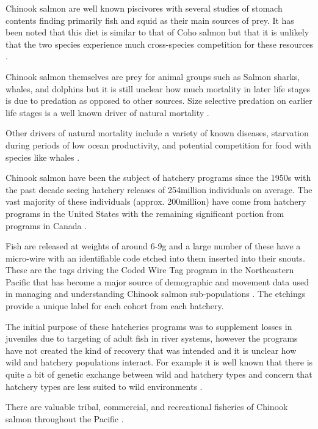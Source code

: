 \documentclass[11pt]{article}
\begin{document}
Chinook salmon are well known piscivores with several studies of stomach contents finding primarily fish and squid as their main sources of prey. It has been noted that this diet is similar to that of Coho salmon but that it is unlikely that the two species experience much cross-species competition for these resources \citep{oceanchinook}. 

Chinook salmon themselves are prey for animal groups such as Salmon sharks, whales, and dolphins but it is still unclear how much mortality in later life stages is due to predation as opposed to other sources. Size selective predation on earlier life stages is a well known driver of natural mortality \citep{oceanchinook}. 

Other drivers of natural mortality include a variety of known diseases, starvation during periods of low ocean productivity, and potential competition for food with species like whales \citep{oceanchinook}.\newline

Chinook salmon have been the subject of hatchery programs since the 1950s with the past decade seeing hatchery releases of 254million individuals on average. The vast majority of these individuals (approx. 200million) have come from hatchery programs in the United States with the remaining significant portion from programs in Canada \citep{oceanchinook}. 

Fish are released at weights of around 6-9g and a large number of these have a micro-wire with an identifiable code etched into them inserted into their snouts. These are the tags driving the Coded Wire Tag program in the Northeastern Pacific that has become a major source of demographic and movement data used in managing and understanding Chinook salmon sub-populations \citep{shelton2019}. The etchings provide a unique label for each cohort from each hatchery. 

The initial purpose of these hatcheries programs was to supplement losses in juveniles due to targeting of adult fish in river systems, however the programs have not created the kind of recovery that was intended and it is unclear how wild and hatchery populations interact. For example it is well known that there is quite a bit of genetic exchange between wild and hatchery types and concern that hatchery types are less suited to wild environments \citep{oceanchinook}. \newline

There are valuable tribal, commercial, and recreational fisheries of Chinook salmon throughout the Pacific \citep{salmonplan}.
\end{document}
